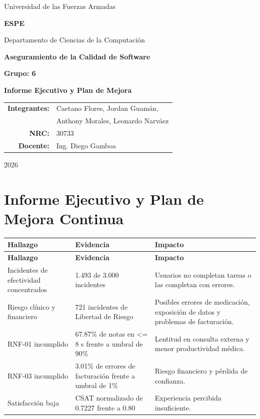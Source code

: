 \documentclass[11pt]{article}
\begin{document}
\begin{titlepage}
\centering
{\Large Universidad de las Fuerzas Armadas\par}
{\LARGE \textbf{ESPE}\par}
\vspace{0.35cm}
{\large Departamento de Ciencias de la Computación\par}
\vspace{1.5cm}
{\Large \textbf{Aseguramiento de la Calidad de Software}\par}
\vspace{0.5cm}
{\large \textbf{Grupo: 6}\par}
\vspace{1.2cm}
{\Large \textbf{Informe Ejecutivo y Plan de Mejora}\par}
\vfill
\begin{tabular}{rl}
\textbf{Integrantes:} & Caetano Flores, Jordan Guamán,\\
& Anthony Morales, Leonardo Narváez\\
\textbf{NRC:} & 30733\\
\textbf{Docente:} & Ing. Diego Gamboa\\
\end{tabular}
\vfill
{\large 2026\par}
\end{titlepage}

\section*{Informe Ejecutivo y Plan de Mejora Continua}

\small
\begin{longtable}{p{} p{} p{}}
\toprule
\textbf{Hallazgo} & \textbf{Evidencia} & \textbf{Impacto} \\
\midrule
\endfirsthead
\toprule
\textbf{Hallazgo} & \textbf{Evidencia} & \textbf{Impacto} \\
\midrule
\endhead
Incidentes de efectividad concentrados & 1.493 de 3.000 incidentes & Usuarios no completan tareas o las completan con errores. \\
Riesgo clínico y financiero & 721 incidentes de Libertad de Riesgo & Posibles errores de medicación, exposición de datos y problemas de facturación. \\
RNF-01 incumplido & 67.87\% de notas en <= 8 s frente a umbral de 90\% & Lentitud en consulta externa y menor productividad médica. \\
RNF-03 incumplido & 3.01\% de errores de facturación frente a umbral de 1\% & Riesgo financiero y pérdida de confianza. \\
Satisfacción baja & CSAT normalizado de 0.7227 frente a 0.80 & Experiencia percibida insuficiente. \\
\bottomrule
\end{longtable}
\normalsize
\end{document}
